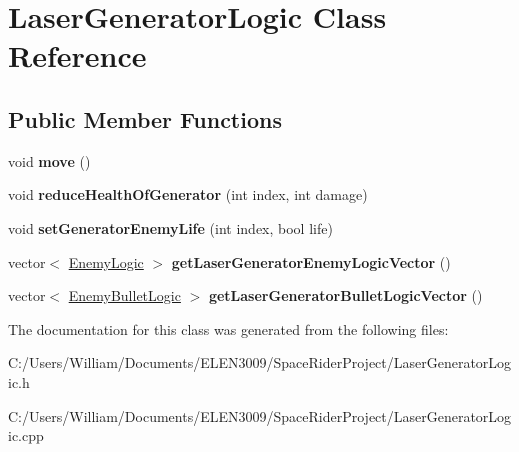 \hypertarget{class_laser_generator_logic}{}\section{Laser\+Generator\+Logic Class Reference}
\label{class_laser_generator_logic}
\subsection*{Public Member Functions}
\begin{DoxyCompactItemize}
\item 
\mbox{\label{class_laser_generator_logic_a0d1ff892a26f82064832b57f13501328}} 
void {\bfseries move} ()
\item 
\mbox{\label{class_laser_generator_logic_abca36f94574eff33848b5b6c3d3ec909}} 
void {\bfseries reduce\+Health\+Of\+Generator} (int index, int damage)
\item 
\mbox{\label{class_laser_generator_logic_a06cbb88e7126a023cb585ef873a2e094}} 
void {\bfseries set\+Generator\+Enemy\+Life} (int index, bool life)
\item 
\mbox{\label{class_laser_generator_logic_a40fe8a8f8c58d916fb6f9fff4265c51a}} 
vector$<$ \hyperlink{class_enemy_logic}{Enemy\+Logic} $>$ {\bfseries get\+Laser\+Generator\+Enemy\+Logic\+Vector} ()
\item 
\mbox{\label{class_laser_generator_logic_a0843c103357c87500b28bbca973f9512}} 
vector$<$ \hyperlink{class_enemy_bullet_logic}{Enemy\+Bullet\+Logic} $>$ {\bfseries get\+Laser\+Generator\+Bullet\+Logic\+Vector} ()
\end{DoxyCompactItemize}


The documentation for this class was generated from the following files\+:\begin{DoxyCompactItemize}
\item 
C\+:/\+Users/\+William/\+Documents/\+E\+L\+E\+N3009/\+Space\+Rider\+Project/Laser\+Generator\+Logic.\+h\item 
C\+:/\+Users/\+William/\+Documents/\+E\+L\+E\+N3009/\+Space\+Rider\+Project/Laser\+Generator\+Logic.\+cpp\end{DoxyCompactItemize}

